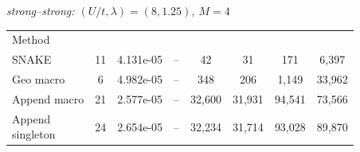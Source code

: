 \documentclass[
  reprint,
  amsmath,
  amssymb,
  aps,
  pra,
  nofootinbib,
  superscriptaddress,
  floatfix
]{revtex4-2}
\newcommand{\twq}{\mathrm{2Q}}
\newcommand{\metrichead}[1]{\makebox[0.061\textwidth][c]{#1}}
\begin{document}
\noindent\begin{minipage}{\columnwidth}
\begin{center}
\scriptsize
\setlength{\tabcolsep}{0.70pt}
\renewcommand{\arraystretch}{1.0}
\textit{strong--strong: $(U/t,\lambda)=(8,1.25)$, \(M=4\)}
\par\smallskip
\begin{ruledtabular}
\begin{tabular}{p{}ccccccc}
Method & \metrichead{$k_{\rm pl}$} & \metrichead{$|\Delta E|$} & \metrichead{$1-F$} & \metrichead{$N_{\twq}$} & \metrichead{$D_{\twq}$} & \metrichead{$D_c$} & \metrichead{$S$}\\
\colrule
SNAKE & 11 & 4.131e-05 & -- & 42 & 31 & 171 & 6,397 \\
Geo macro & 6 & 4.982e-05 & -- & 348 & 206 & 1,149 & 33,962 \\
Append macro & 21 & 2.577e-05 & -- & 32,600 & 31,931 & 94,541 & 73,566 \\
\shortstack[l]{Append\\singleton} & 24 & 2.654e-05 & -- & 32,234 & 31,714 & 93,028 & 89,870 \\
\end{tabular}
\end{ruledtabular}
\end{center}
\end{minipage}
\par\addvspace{0.45ex}
\par\addvspace{1.0ex}
\clearpage
\end{document}
